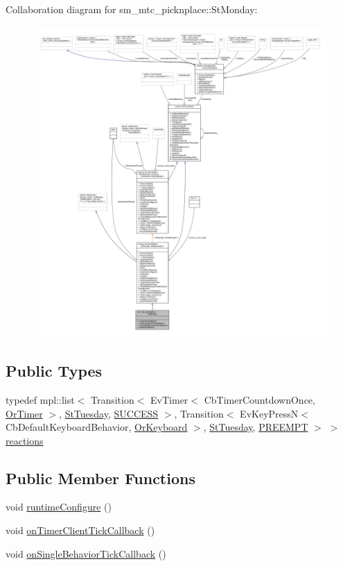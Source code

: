 Collaboration diagram for sm\+\_\+mtc\+\_\+picknplace\+:\+:St\+Monday\+:
\nopagebreak
\begin{figure}[H]
\begin{center}
\leavevmode
\includegraphics[width=350pt]{structsm__mtc__picknplace_1_1StMonday__coll__graph}
\end{center}
\end{figure}
\subsection*{Public Types}
\begin{DoxyCompactItemize}
\item 
typedef mpl\+::list$<$ Transition$<$ Ev\+Timer$<$ Cb\+Timer\+Countdown\+Once, \hyperlink{classsm__mtc__picknplace_1_1OrTimer}{Or\+Timer} $>$, \hyperlink{structsm__mtc__picknplace_1_1StTuesday}{St\+Tuesday}, \hyperlink{classSUCCESS}{S\+U\+C\+C\+E\+SS} $>$, Transition$<$ Ev\+Key\+PressN$<$ Cb\+Default\+Keyboard\+Behavior, \hyperlink{classsm__mtc__picknplace_1_1OrKeyboard}{Or\+Keyboard} $>$, \hyperlink{structsm__mtc__picknplace_1_1StTuesday}{St\+Tuesday}, \hyperlink{classPREEMPT}{P\+R\+E\+E\+M\+PT} $>$ $>$ \hyperlink{structsm__mtc__picknplace_1_1StMonday_ad6381a247c375a8150eee43d7569e479}{reactions}
\end{DoxyCompactItemize}
\subsection*{Public Member Functions}
\begin{DoxyCompactItemize}
\item 
void \hyperlink{structsm__mtc__picknplace_1_1StMonday_a588c6ec92a30ce70a48be1beedc96f6e}{runtime\+Configure} ()
\item 
void \hyperlink{structsm__mtc__picknplace_1_1StMonday_a035efe7d5e44235ecaf3411ff1509ad1}{on\+Timer\+Client\+Tick\+Callback} ()
\item 
void \hyperlink{structsm__mtc__picknplace_1_1StMonday_a9360c37caafe5065499cc6774c7eb514}{on\+Single\+Behavior\+Tick\+Callback} ()
\end{DoxyCompactItemize}
